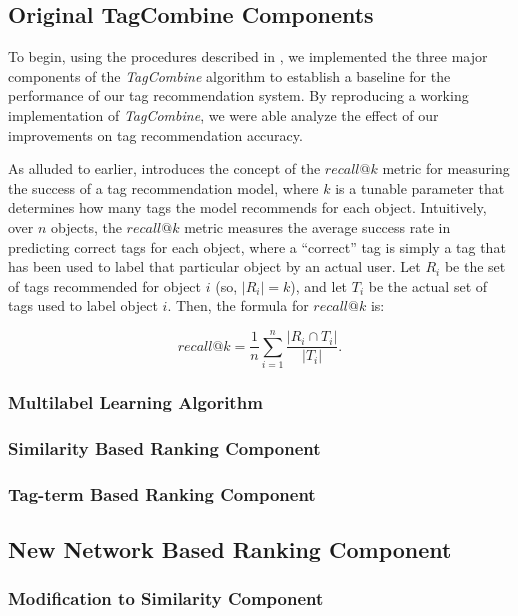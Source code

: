 \documentclass[10pt]{IEEEtran}
\begin{document}
\subsection{Original TagCombine Components}

To begin, using the procedures described in \cite{1}, we implemented the three major components of the \textit{TagCombine} algorithm to establish a baseline for the performance of our tag recommendation system. By reproducing a working implementation of \textit{TagCombine}, we were able analyze the effect of our improvements on tag recommendation accuracy.

As alluded to earlier, \cite{1} introduces the concept of the $recall@k$ metric for measuring the success of a tag recommendation model, where $k$ is a tunable parameter that determines how many tags the model recommends for each object. Intuitively, over $n$ objects, the $recall@k$ metric measures the average success rate in predicting correct tags for each object, where a ``correct'' tag is simply a tag that has been used to label that particular object by an actual user. Let $R_i$ be the set of tags recommended for object $i$ (so, $|R_i| = k$), and let $T_i$ be the actual set of tags used to label object $i$. Then, the formula for $recall@k$ is:

\[recall@k = \frac{1}{n}\sum\limits_{i=1}^{n}\frac{|R_i \cap T_i|}{|T_i|}.\]

\subsubsection{Multilabel Learning Algorithm}

\subsubsection{Similarity Based Ranking Component}

\subsubsection{Tag-term Based Ranking Component}

\subsection{New Network Based Ranking Component}

\subsubsection{Modification to Similarity Component}
\end{document}
